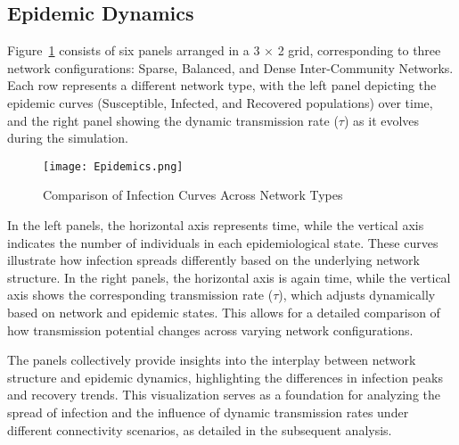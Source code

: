 \documentclass[12pt,a4paper]{article}
\begin{document}
\subsection{Epidemic Dynamics}

Figure~\ref{fig:epidemic_curves} consists of six panels arranged in a 3 × 2 grid, corresponding to three network configurations: Sparse, Balanced, and Dense Inter-Community Networks. Each row represents a different network type, with the left panel depicting the epidemic curves (Susceptible, Infected, and Recovered populations) over time, and the right panel showing the dynamic transmission rate (\(\tau\)) as it evolves during the simulation.
\begin{figure}[H]
    \centering
    \texttt{[image: Epidemics.png]}
    \caption{Comparison of Infection Curves Across Network Types}
    \label{fig:epidemic_curves}
\end{figure}
In the left panels, the horizontal axis represents time, while the vertical axis indicates the number of individuals in each epidemiological state. These curves illustrate how infection spreads differently based on the underlying network structure. In the right panels, the horizontal axis is again time, while the vertical axis shows the corresponding transmission rate (\(\tau\)), which adjusts dynamically based on network and epidemic states. This allows for a detailed comparison of how transmission potential changes across varying network configurations.

The panels collectively provide insights into the interplay between network structure and epidemic dynamics, highlighting the differences in infection peaks and recovery trends. This visualization serves as a foundation for analyzing the spread of infection and the influence of dynamic transmission rates under different connectivity scenarios, as detailed in the subsequent analysis.
\end{document}
